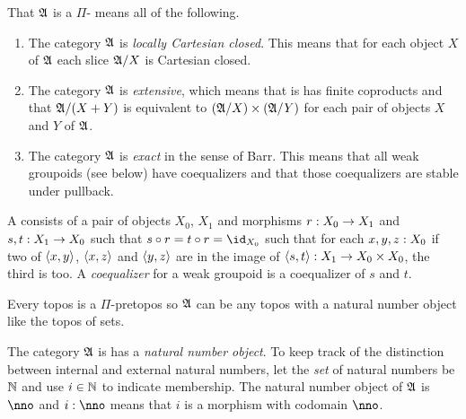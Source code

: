 \documentclass[csh.tex]{subfiles}
\begin{document}
\begin{definition} 
That $\mathfrak A$ is a $\Pi$- means all of the following.

\begin{enumerate}
\item The category $\mathfrak A$ is \emph{locally Cartesian closed}. This means that for each object $X$ of $\mathfrak A$ each slice $\mathfrak A/X$ is Cartesian closed.
\item The category $\mathfrak A$ is \emph{extensive}, which means that is has finite coproducts and that $\mathfrak A/(X+Y)$ is equivalent to $(\mathfrak A/X)\times(\mathfrak A/Y)$ for each pair of objects $X$ and $Y$ of $\mathfrak A$.
\item The category $\mathfrak A$ is \emph{exact} in the sense of Barr. This means that all weak groupoids (see below) have coequalizers and that those coequalizers are stable under pullback.
\end{enumerate}

A  consists of a pair of objects $X_0$, $X_1$ and morphisms $r: X_0\to X_1$ and $s,t: X_1\to X_0$ such that $s\circ r= t\circ r = \id_{X_0}$ such that for each $x,y,z: X_0$ if two of $\left\langle x,y \right\rangle$, $\left\langle x,z \right\rangle$ and $\left\langle y,z \right\rangle$ are in the image of $\left\langle s,t \right\rangle: X_1\to X_0\times X_0$, the third is too. A \emph{coequalizer} for a weak groupoid is a coequalizer of $s$ and $t$.
\end{definition}

\begin{example} Every topos is a $\Pi$-pretopos so $\mathfrak A$ can be any topos with a natural number object like the topos of sets. \end{example}

The category $\mathfrak A$ is has a \emph{natural number object}. To keep track of the distinction between internal and external natural numbers, let the \emph{set} of natural numbers be $\mathbb N$ and use $i\in \mathbb N$ to indicate membership. The natural number object of $\mathfrak A$ is $\nno$ and $i\of\nno$ means that $i$ is a morphism with codomain $\nno$.
\end{document}

